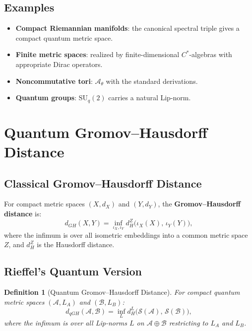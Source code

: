\documentclass[11pt,a4paper]{article}
\newtheorem{definition}{Definition}[section]
\begin{document}
\subsection{Examples}

\begin{itemize}[nosep]
  \item \textbf{Compact Riemannian manifolds}: the canonical spectral triple
        gives a compact quantum metric space.
  \item \textbf{Finite metric spaces}: realized by finite-dimensional
        $C^*$-algebras with appropriate Dirac operators.
  \item \textbf{Noncommutative tori}: $\mathcal{A}_\theta$ with the standard
        derivations.
  \item \textbf{Quantum groups}: $\mathrm{SU}_q(2)$ carries a natural Lip-norm.
\end{itemize}

\section{Quantum Gromov--Hausdorff Distance}

\subsection{Classical Gromov--Hausdorff Distance}

For compact metric spaces $(X, d_X)$ and $(Y, d_Y)$, the \textbf{Gromov--Hausdorff
distance} is:
\begin{equation}
  d_{GH}(X, Y) = \inf_{\iota_X, \iota_Y} d_H^Z\bigl(\iota_X(X),\, \iota_Y(Y)\bigr),
\end{equation}
where the infimum is over all isometric embeddings into a common metric space $Z$,
and $d_H^Z$ is the Hausdorff distance.

\subsection{Rieffel's Quantum Version}

\begin{definition}[Quantum Gromov--Hausdorff Distance]
For compact quantum metric spaces $(\mathcal{A}, L_A)$ and $(\mathcal{B}, L_B)$:
\begin{equation}
  d_{qGH}(\mathcal{A}, \mathcal{B}) = \inf_{L} d_H^{L}\bigl(
  \mathcal{S}(\mathcal{A}),\, \mathcal{S}(\mathcal{B})\bigr),
\end{equation}
where the infimum is over all Lip-norms $L$ on $\mathcal{A} \oplus \mathcal{B}$
restricting to $L_A$ and $L_B$.
\end{definition}
\end{document}
